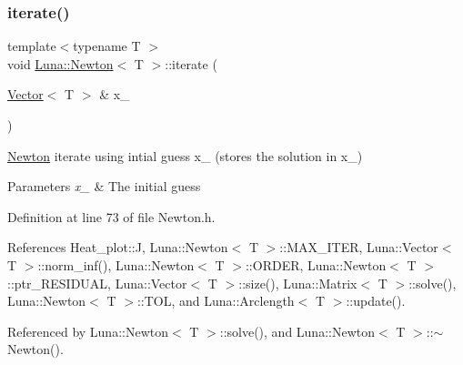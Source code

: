 \mbox{\label{classLuna_1_1Newton_a3de816dba7a950702b6f93fc710d4f03}} 
\subsubsection{\texorpdfstring{iterate()}{iterate()}}
{\footnotesize\ttfamily template$<$typename T $>$ \\
void \hyperlink{classLuna_1_1Newton}{Luna\+::\+Newton}$<$ T $>$\+::iterate (\begin{DoxyParamCaption}\item[{\hyperlink{classLuna_1_1Vector}{Vector}$<$ T $>$ \&}]{x\+\_ }\end{DoxyParamCaption})\hspace{0.3cm}{\ttfamily [inline]}}



\hyperlink{classLuna_1_1Newton}{Newton} iterate using intial guess x\+\_ (stores the solution in x\+\_) 


\begin{DoxyParams}{Parameters}
{\em x\+\_} & The initial guess \\
\hline
\end{DoxyParams}


Definition at line 73 of file Newton.\+h.



References Heat\+\_\+plot\+::J, Luna\+::\+Newton$<$ T $>$\+::\+M\+A\+X\+\_\+\+I\+T\+ER, Luna\+::\+Vector$<$ T $>$\+::norm\+\_\+inf(), Luna\+::\+Newton$<$ T $>$\+::\+O\+R\+D\+ER, Luna\+::\+Newton$<$ T $>$\+::ptr\+\_\+\+R\+E\+S\+I\+D\+U\+AL, Luna\+::\+Vector$<$ T $>$\+::size(), Luna\+::\+Matrix$<$ T $>$\+::solve(), Luna\+::\+Newton$<$ T $>$\+::\+T\+OL, and Luna\+::\+Arclength$<$ T $>$\+::update().



Referenced by Luna\+::\+Newton$<$ T $>$\+::solve(), and Luna\+::\+Newton$<$ T $>$\+::$\sim$\+Newton().


